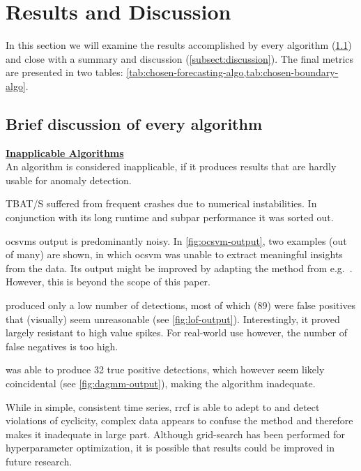\section{Results and Discussion}\label{sect:results-and-discussion}
In this section we will examine the results accomplished by every algorithm
(\cref{subsect:brief-algo-discussion}) and close with a summary and discussion
(\cref{subsect:discussion}). The final metrics are presented in two tables:
\cref{tab:chosen-forecasting-algo,tab:chosen-boundary-algo}.

\subsection{Brief discussion of every algorithm}\label{subsect:brief-algo-discussion}
\bigskip
{\large\uline{\textbf{Inapplicable Algorithms}}}\\
An algorithm is considered inapplicable, if it produces results that are hardly
usable for anomaly detection.
\begin{description}[style=unboxed,leftmargin=0cm]
    \item[TBAT/S] TBAT/S suffered from frequent crashes due to numerical instabilities.
    In conjunction with its long runtime and subpar performance it was sorted out.
    \item[OCSVM] \gls{ocsvm}s output is predominantly noisy. In \cref{fig:ocsvm-output},
    two examples (out of many) are shown, in which \gls{ocsvm} was unable to extract
    meaningful insights from the data. Its output might be improved by adapting
    the method from e.g.\ \textcite{GomezVerdejo.2011}. However, this is beyond
    the scope of this paper.
    \item[LOF] produced only a low number of detections, most of which
    (89) were false positives that (visually) seem unreasonable (see \cref{fig:lof-output}).
    Interestingly, it proved largely resistant to high value spikes.
    For real-world use however, the number of false negatives is too high.
    \item[DAGMM] was able to produce 32 true positive detections,
    which however seem likely coincidental (see \cref{fig:dagmm-output}), making
    the algorithm inadequate.
    \item[RRCF] While in simple, consistent time series, \gls{rrcf} is able to
    adept to and detect violations of cyclicity, complex data appears to confuse
    the method and therefore makes it inadequate in large part. Although grid-search
    has been performed for hyperparameter optimization, it is possible that
    results could be improved in future research.
\end{description}
